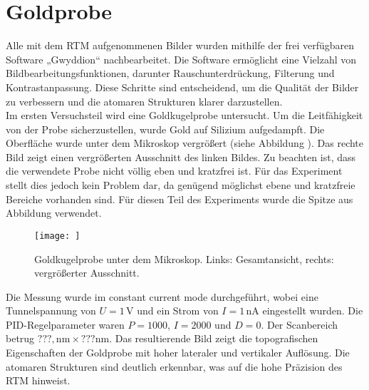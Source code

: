 \chapter{Goldprobe}
Alle mit dem RTM aufgenommenen Bilder wurden mithilfe der frei verfügbaren Software „Gwyddion“ nachbearbeitet.
Die Software ermöglicht eine Vielzahl von Bildbearbeitungsfunktionen, darunter Rauschunterdrückung, Filterung und Kontrastanpassung. Diese Schritte sind entscheidend, um die Qualität der Bilder zu verbessern und die atomaren Strukturen klarer darzustellen.\\
Im ersten Versuchsteil wird eine Goldkugelprobe untersucht. Um die Leitfähigkeit von der Probe sicherzustellen, wurde Gold auf Silizium aufgedampft. Die Oberfläche wurde unter dem Mikroskop vergrößert (siehe Abbildung %
). Das rechte Bild zeigt einen vergrößerten Ausschnitt des linken Bildes. Zu beachten ist, dass die verwendete Probe nicht völlig eben und kratzfrei ist. Für das Experiment stellt dies jedoch kein Problem dar, da genügend möglichst ebene und kratzfreie Bereiche vorhanden sind. Für diesen Teil des Experiments wurde die Spitze aus Abbildung %
 verwendet.
\begin{figure}[H]
    \centering
    \texttt{[image: ]}
    \caption{Goldkugelprobe unter dem Mikroskop. Links: Gesamtansicht, rechts: vergrößerter Ausschnitt.}
    \label{fig:goldprobe}
\end{figure}
Die Messung wurde im constant current mode durchgeführt, wobei eine Tunnelspannung von $U = 1\,\text{V}$ und ein Strom von $I = 1\,\text{nA}$ eingestellt wurden. Die PID-Regelparameter waren $P = 1000$, $I = 2000$ und $D = 0$. Der Scanbereich betrug $???,\text{nm} \times ???\text{nm}$. Das resultierende Bild zeigt die topografischen Eigenschaften der Goldprobe mit hoher lateraler und vertikaler Auflösung. Die atomaren Strukturen sind deutlich erkennbar, was auf die hohe Präzision des RTM hinweist.\\